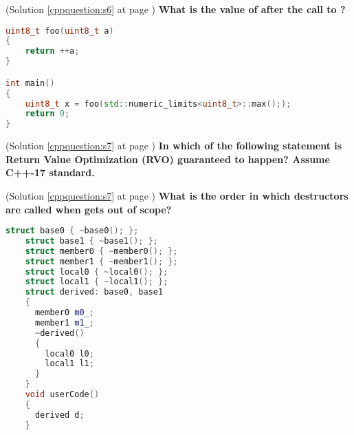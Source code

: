 \begin{cppquestion}
    \label{cppquestion:q6}
    (Solution \ref{cppquestion:s6} at page \pageref{cppquestion:s6})
    \question \textbf{What is the value of  after the call to ?} 
\begin{lstlisting}[language=c++,numbers=none, caption={}]
uint8_t foo(uint8_t a)
{
    return ++a;
}

int main()
{
    uint8_t x = foo(std::numeric_limits<uint8_t>::max(););
    return 0;
}
\end{lstlisting}
    \begin{choices}
     \choice {}
     \choice {}
     \choice {}
     \choice {}
     \choice {}
     \choice {}
     \choice {}
     \choice {}
     \choice {}
    \end{choices}
\end{cppquestion}



\begin{cppquestion}
    \label{cppquestion:q6}
    (Solution \ref{cppquestion:s7} at page \pageref{cppquestion:s7})
    \question \textbf{In which of the following statement is Return Value Optimization (RVO) guaranteed to happen? Assume C++-17 standard.} 
    \begin{choices}
     \choice {}
     \choice {}
     \choice {}
     \choice {}
    \end{choices}
\end{cppquestion}



\begin{cppquestion}
    \label{cppquestion:q7}
    (Solution \ref{cppquestion:s7} at page \pageref{cppquestion:s7})
    \question \textbf{What is the order in which destructors are called when  gets out of scope?} 
\begin{lstlisting}[language=c++,numbers=none, caption={}]
    struct base0 { ~base0(); };
    struct base1 { ~base1(); };
    struct member0 { ~member0(); };
    struct member1 { ~member1(); };
    struct local0 { ~local0(); };
    struct local1 { ~local1(); };
    struct derived: base0, base1
    {
      member0 m0_;
      member1 m1_;
      ~derived()
      {
        local0 l0;
        local1 l1;
      }
    }
    void userCode()
    {
      derived d;
    }                 
\end{lstlisting} 
\end{cppquestion}

















